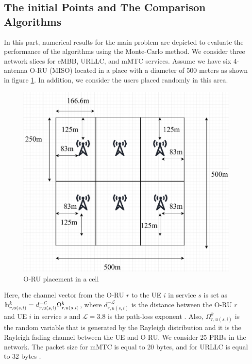 \documentclass[lettersize,journal]{IEEEtran}
\begin{document}
\subsection{The initial Points and The Comparison Algorithms}
In this part, numerical results for the main problem are depicted to evaluate the performance of the algorithms using the Monte-Carlo method. We consider three network slices for eMBB, URLLC, and mMTC services.
Assume we have six 4-antenna O-RU (MISO) located in a place with a diameter of 500 meters as shown in figure \ref{fig:cell}. In addition, we consider the users placed randomly in this area.
\begin{figure}
  \centering
    \includegraphics[scale = 0.3]{cell.pdf}
  \caption{O-RU placement in a cell}
  \label{fig:cell}
\end{figure}
Here, the channel vector from the O-RU $r$ to the UE $i$ in service $s$ is set as $\bold{h}_{r,u(s,i)}^{k}=d_{r,u(s,i)}^{-\mathcal{L}} \Omega_{r,u(s,i)}^{k} $, where $d_{r,u(s,i)}^{-\mathcal{L}} $ is the distance between the O-RU $r$ and UE $i$ in service $s$ and $\mathcal{L} = 3.8$ is the path-loss exponent \cite{gholipoor2020cloud}.
Also, $\Omega_{r,u(s,i)}^{k}$ is the random variable that is generated by the Rayleigh distribution and it is the Rayleigh fading channel between the UE and O-RU.
We consider 25 PRBs in the network. The packet size for mMTC is equal to 20 bytes, and for URLLC is equal to 32 bytes \cite{ETSI1}.
\end{document}
